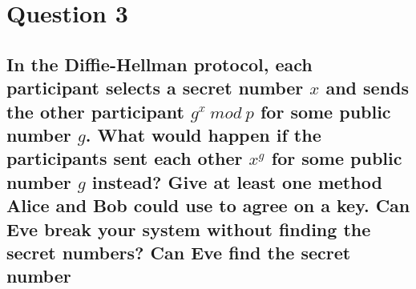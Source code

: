 \documentclass{report}
\begin{document}
	\section{Question 3}
	\startsection
		\renewcommand{\thesubsection}{\thesection.\Alph{subsection}}
		\subsection{In the Diffie-Hellman protocol, each participant selects a secret number $x$ and sends the other participant $g^x \ mod \ p$ for some public number $g$. What would happen if the participants sent each other $x^g$ for some public number $g$ instead? Give at least one method Alice and Bob could use to agree on a key. Can Eve break your system without finding the secret numbers? Can Eve find the secret number}
		\startsubsection
		\closesection
	\closesection
\end{document}
